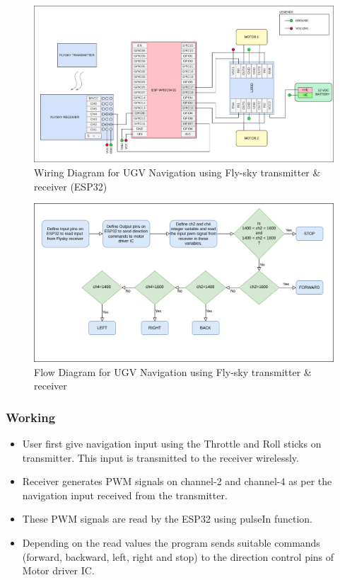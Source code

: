 \begin{figure}[h!]
\centering
\includegraphics[width=\columnwidth]{./Figures/Wiring_UGV_flysky1.png}
\caption{Wiring Diagram for UGV Navigation using Fly-sky transmitter \& receiver (ESP32)}
\label{Wiring_UGV_flysky1}
\end{figure}

\begin{figure}[h!]
\centering
\includegraphics[width=\columnwidth]{./Figures/Flow_UGV_flysky.png}
\caption{Flow Diagram for UGV Navigation using Fly-sky transmitter \& receiver}
\label{Flow_UGV_flysky}
\end{figure}

\subsubsection{Working}
\begin{itemize}
    \item User first give navigation input using the Throttle and Roll sticks on transmitter. This input is transmitted to the receiver wirelessly.
    \item Receiver generates PWM signals on channel-2 and channel-4 as per the navigation input received from the transmitter.
    \item These PWM signals are read by the ESP32 using pulseIn function.
    \item Depending on the read values the program sends suitable commands (forward, backward, left, right and stop) to the direction control pins of Motor driver IC.
\end{itemize}

